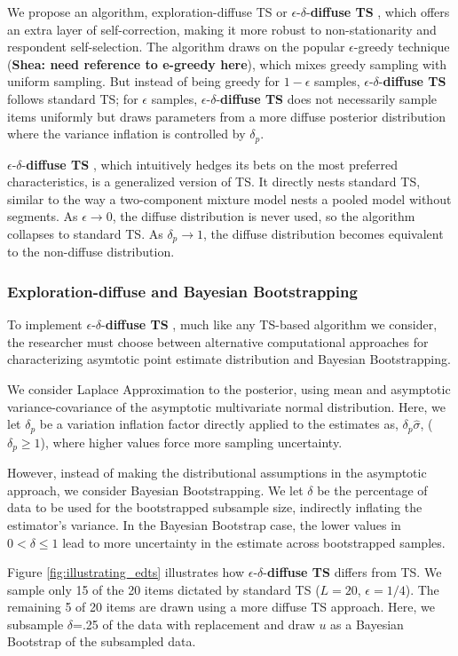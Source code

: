 \documentclass[a4paper,11pt]{article}
\newcommand{\edts}{$\epsilon$-$\delta$-\textbf{diffuse TS} }
\newcommand{\numperset}{L}
\begin{document}
We propose an algorithm, exploration-diffuse TS or \edts, which offers an extra layer of self-correction, making it more robust to non-stationarity and respondent self-selection. The algorithm draws on the popular $\epsilon$-greedy technique (\textbf{Shea: need reference to e-greedy here}), which mixes greedy sampling with uniform sampling. But instead of being greedy for $1-\epsilon$ samples, \edts follows standard TS; for $\epsilon$ samples, \edts does not necessarily sample items uniformly but draws parameters from a more diffuse posterior distribution where the variance inflation is controlled by $\delta_p$.

\edts, which intuitively hedges its bets on the most preferred characteristics, is a generalized version of TS. It directly nests standard TS, similar to the way a two-component mixture model nests a pooled model without segments. As $\epsilon \to 0$, the diffuse distribution is never used, so the algorithm collapses to standard TS. As $\delta_p \to 1$, the diffuse distribution becomes equivalent to the non-diffuse distribution. 

\subsubsection{Exploration-diffuse and Bayesian Bootstrapping}

To implement \edts, much like any TS-based algorithm we consider, the researcher must choose between alternative computational approaches for characterizing asymtotic point estimate distribution and Bayesian Bootstrapping. 

We consider Laplace Approximation to the posterior, using mean and asymptotic variance-covariance of the asymptotic multivariate normal distribution. Here, we let $\delta_p$ be a variation inflation factor directly applied to the estimates as, $\delta_p  \hat \sigma$, ($\delta_p \geq 1$), where higher values force more sampling uncertainty.

However, instead of making the distributional assumptions in the asymptotic approach, we consider Bayesian Bootstrapping. We let $\delta$ be the percentage of data to be used for the bootstrapped subsample size, indirectly inflating the estimator's variance. In the Bayesian Bootstrap case, the lower values in $0 < \delta \leq 1$ lead to more uncertainty in the estimate across bootstrapped samples.

Figure \ref{fig:illustrating_edts} illustrates how \edts differs from TS. We sample only 15 of the 20 items dictated by standard TS ($\numperset=20$, $\epsilon=1/4$). The remaining 5 of 20 items are drawn using a more diffuse TS approach. Here, we subsample $\delta$=.25 of the data with replacement and draw $u$ as a Bayesian Bootstrap of the subsampled data. 
\end{document}
